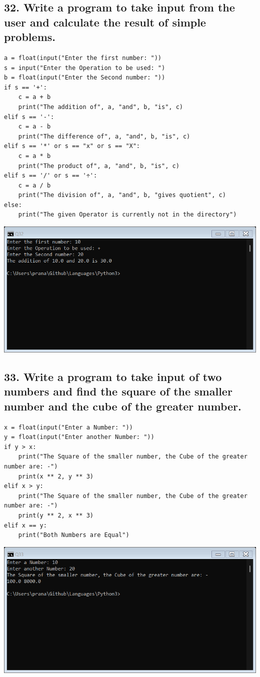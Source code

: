 \documentclass[12pt]{article}
\begin{document}
\subsection*{32. Write a program to take input from the user and calculate the result of simple problems.}
\begin{verbatim}
a = float(input("Enter the first number: "))
s = input("Enter the Operation to be used: ")
b = float(input("Enter the Second number: "))
if s == '+':
    c = a + b
    print("The addition of", a, "and", b, "is", c)
elif s == '-':
    c = a - b
    print("The difference of", a, "and", b, "is", c)
elif s == '*' or s == "x" or s == "X":
    c = a * b
    print("The product of", a, "and", b, "is", c)
elif s == '/' or s == '÷':
    c = a / b
    print("The division of", a, "and", b, "gives quotient", c)
else:
    print("The given Operator is currently not in the directory")
\end{verbatim}
\includegraphics[width=\linewidth]{images/32.png}

\subsection*{33. Write a program to take input of two numbers and find the square of the smaller number and the cube of the greater number.}
\begin{verbatim}
x = float(input("Enter a Number: "))
y = float(input("Enter another Number: "))
if y > x:
    print("The Square of the smaller number, the Cube of the greater number are: -")
    print(x ** 2, y ** 3)
elif x > y:
    print("The Square of the smaller number, the Cube of the greater number are: -")
    print(y ** 2, x ** 3)
elif x == y:
    print("Both Numbers are Equal")
\end{verbatim}
\includegraphics[width=\linewidth]{images/33.png}
\end{document}
